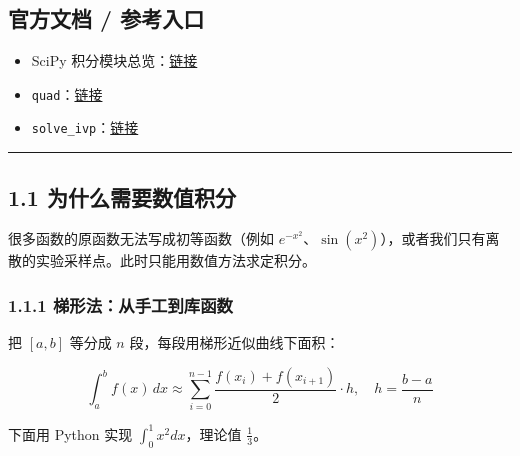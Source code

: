 \subsection{官方文档 /
参考入口}\label{ux5b98ux65b9ux6587ux6863-ux53c2ux8003ux5165ux53e3}

\begin{itemize}
\tightlist
\item
  SciPy
  积分模块总览：\href{https://docs.scipy.org/doc/scipy/reference/integrate.html}{链接}
\item
  \texttt{quad}：\href{https://docs.scipy.org/doc/scipy/reference/generated/scipy.integrate.quad.html}{链接}
\item
  \texttt{solve\_ivp}：\href{https://docs.scipy.org/doc/scipy/reference/generated/scipy.integrate.solve_ivp.html}{链接}
\end{itemize}

\begin{center}\rule{0.5\linewidth}{0.5pt}\end{center}

\subsection{1.1
为什么需要数值积分}\label{ux4e3aux4ec0ux4e48ux9700ux8981ux6570ux503cux79efux5206}

很多函数的原函数无法写成初等函数（例如
\(e^{-x^2}\)、\(\sin(x^2)\)），或者我们只有离散的实验采样点。此时只能用数值方法求定积分。

\subsubsection{1.1.1
梯形法：从手工到库函数}\label{ux68afux5f62ux6cd5ux4eceux624bux5de5ux5230ux5e93ux51fdux6570}

把 \([a,b]\) 等分成 \(n\) 段，每段用梯形近似曲线下面积：

\[\int_a^b f(x)\,dx \approx \sum_{i=0}^{n-1}\frac{f(x_i)+f(x_{i+1})}{2}\cdot h,\quad h=\frac{b-a}{n}\]

下面用 Python 实现 \(\int_0^1 x^2 dx\)，理论值 \(\frac{1}{3}\)。

